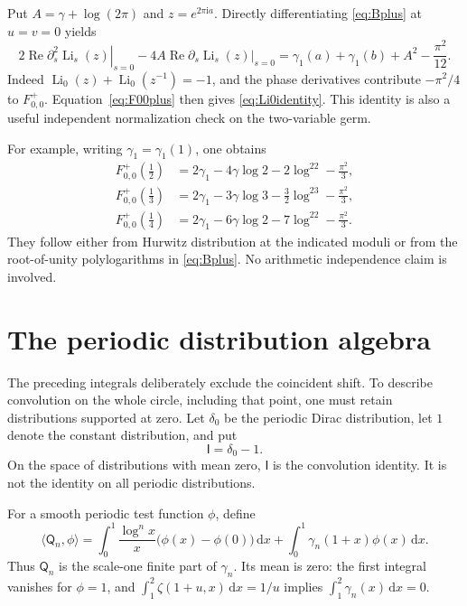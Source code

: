 \documentclass[11pt]{article}
\numberwithin{equation}{section}
\theoremstyle{definition}\newtheorem{definition}[theorem]{Definition}
\theoremstyle{remark}\newtheorem{remark}[theorem]{Remark}
\DeclareMathOperator{\Li}{Li}
\DeclareMathOperator{\Rea}{Re}
\newcommand{\dd}{\,\mathrm d}
\newcommand{\iu}{\mathrm i}
\newcommand{\qn}[1]{\mathsf Q_{#1}}
\newcommand{\id}{\mathsf I}
\begin{document}
Put $A=\gamma+\log(2\pi)$ and $z=e^{2\pi\iu a}$. Directly differentiating
\eqref{eq:Bplus} at $u=v=0$ yields
\begin{equation}\label{eq:Li0identity}
 2\Rea\left.\partial_s^2\Li_s(z)\right|_{s=0}
 -4A\Rea\left.\partial_s\Li_s(z)\right|_{s=0}
 =\gamma_1(a)+\gamma_1(b)+A^2-\frac{\pi^2}{12}.
\end{equation}
Indeed $\Li_0(z)+\Li_0(z^{-1})=-1$, and the phase derivatives contribute
$-\pi^2/4$ to $F^+_{0,0}$. Equation~\eqref{eq:F00plus} then gives
\eqref{eq:Li0identity}. This identity is also a useful independent
normalization check on the two-variable germ.

For example, writing $\gamma_1=\gamma_1(1)$, one obtains
\begin{align}
 F^+_{0,0}(\tfrac12)
 &=2\gamma_1-4\gamma\log2-2\log^22-\frac{\pi^2}{3},\label{eq:halfFP}\\
 F^+_{0,0}(\tfrac13)
 &=2\gamma_1-3\gamma\log3-\frac32\log^23-\frac{\pi^2}{3},\label{eq:thirdFP}\\
 F^+_{0,0}(\tfrac14)
 &=2\gamma_1-6\gamma\log2-7\log^22-\frac{\pi^2}{3}.
       \label{eq:quarterFP}
\end{align}
They follow either from Hurwitz distribution at the indicated moduli or
from the root-of-unity polylogarithms in \eqref{eq:Bplus}. No arithmetic
independence claim is involved.

\section{The periodic distribution algebra}
\label{sec:algebra}

The preceding integrals deliberately exclude the coincident shift. To
describe convolution on the whole circle, including that point, one must
retain distributions supported at zero. Let $\delta_0$ be the periodic
Dirac distribution, let $1$ denote the constant distribution, and put
\begin{equation}\label{eq:unit}
 \id=\delta_0-1.
\end{equation}
On the space of distributions with mean zero, $\id$ is the convolution
identity. It is not the identity on all periodic distributions.

For a smooth periodic test function $\phi$, define
\begin{equation}\label{eq:Qdefinition}
 \langle\qn n,\phi\rangle
 =\int_0^1\frac{\log^n x}{x}\bigl(\phi(x)-\phi(0)\bigr)\dd x
   +\int_0^1\gamma_n(1+x)\phi(x)\dd x.
\end{equation}
Thus $\qn n$ is the scale-one finite part of $\gamma_n$.
Its mean is zero: the first integral vanishes for $\phi=1$, and
$\int_1^2\zeta(1+u,x)\dd x=1/u$ implies
$\int_1^2\gamma_n(x)\dd x=0$.
\end{document}
